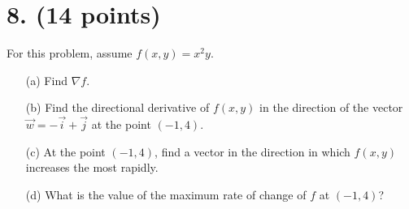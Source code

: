 \section*{8. (14 points)}
For this problem, assume \( f(x, y) = x^2 y \).
\begin{enumerate}
    \item[(a)] Find \( \nabla f \).
    \item[(b)] Find the directional derivative of \( f(x, y) \) in the direction of the vector \( \vec{w} = -\vec{i} + \vec{j} \) at the point \( (-1, 4) \).
    \item[(c)] At the point \( (-1, 4) \), find a vector in the direction in which \( f(x, y) \) increases the most rapidly.
    \item[(d)] What is the value of the maximum rate of change of \( f \) at \( (-1, 4) \)?
\end{enumerate}
